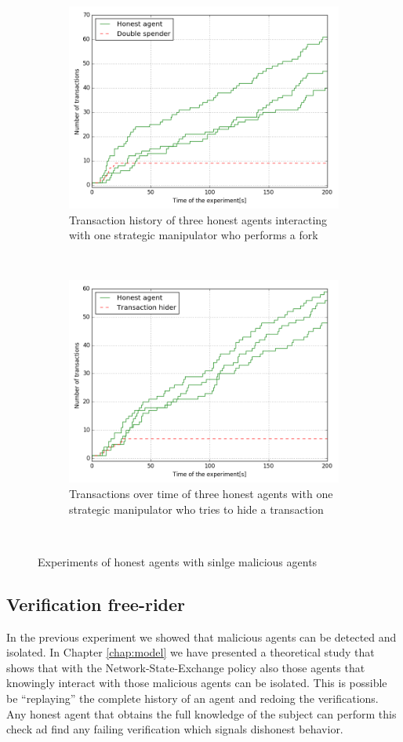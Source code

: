 \begin{figure}
    \begin{subfigure}{\textwidth}
      \centering
      \includegraphics[width=.7\linewidth]{images/double_spending}
      \caption{Transaction history of three honest agents interacting with one strategic manipulator who performs a fork}
      \label{fig:forking}
    \end{subfigure}\\
    \begin{subfigure}{\textwidth}
      \centering
      \includegraphics[width=.7\linewidth]{images/transaction_hiding}
      \caption{Transactions over time of three honest agents with one strategic manipulator who tries to hide a transaction}
      \label{fig:DFR_empty_exchanges}
    \end{subfigure}\\
    \caption{Experiments of honest agents with sinlge malicious agents}
    \label{fig:malicious}
\end{figure}

\subsection{Verification free-rider}
In the previous experiment we showed that malicious agents can be detected and isolated. In Chapter
\ref{chap:model} we have presented a theoretical study that shows that with the Network-State-Exchange
policy also those agents that knowingly interact with those malicious agents can
be isolated. This is possible be ``replaying'' the complete history of an agent and redoing the 
verifications. Any honest agent that obtains the full knowledge of the subject can perform this check 
ad find any failing verification which signals dishonest behavior.

